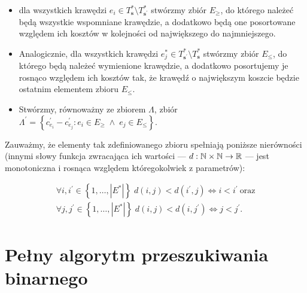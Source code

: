 {\begin{itemize}
	\item dla wszystkich krawędzi $e_{i} \in T^{\ast}_{\textbf{s}} \setminus T^{\ast}_{\textbf{s}^{\prime}}$ stwórzmy zbiór $E_{\geqslant}$, do którego należeć będą wszystkie wspomniane krawędzie, a dodatkowo będą one posortowane względem ich kosztów w kolejności od największego do najmniejszego.
	\item Analogicznie, dla wszystkich krawędzi $e^{\ast}_{j} \in T^{\ast}_{\textbf{s}^{\prime}} \setminus  T^{\ast}_{\textbf{s}}$ stwórzmy zbiór $E_{\leqslant}$, do którego będą należeć wymienione krawędzie, a dodatkowo posortujemy je rosnąco względem ich kosztów tak, że krawędź o największym koszcie będzie ostatnim elementem zbioru $E_{\leqslant}$.
	\item Stwórzmy, równoważny ze zbiorem $\Lambda$, zbiór $\Lambda^{\prime} = \left\{ c^{\prime}_{e_{i}} - c^{\prime}_{e_{j}} : e_{i} \in E_{\geqslant} \; \wedge \; e_{j} \in E_{\leqslant} \right\}$.
\end{itemize}

Zauważmy, że elementy tak zdefiniowanego zbioru spełniają poniższe nierówności (innymi słowy funkcja zwracająca ich wartości --- $d: \mathbb{N} \times \mathbb{N} \rightarrow \mathbb{R}$ --- jest monotoniczna i rosnąca względem któregokolwiek z parametrów):

\begin{gather}\label{eq:ddiffvalues}
	\forall i, i^{\prime} \in \left\{ 1, \dots, \left| E^{\ast} \right| \right\} \; d \left( i, j \right) < d \left( i^{\prime}, j \right) \Leftrightarrow i < i^{\prime}~\text{oraz}\\
	\forall j, j^{\prime} \in \left\{ 1, \dots, \left| E^{\ast} \right| \right\} \; d \left( i, j \right) < d \left( i, j^{\prime} \right) \Leftrightarrow j < j^{\prime}\text{.}
\end{gather}

\section{Pełny algorytm przeszukiwania binarnego}

}
